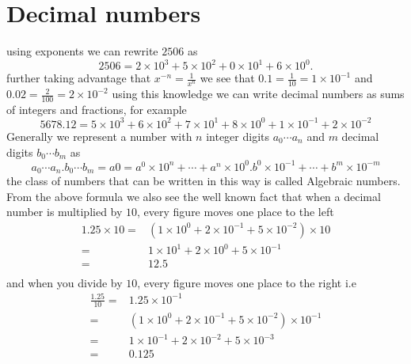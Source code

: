 \section{Decimal numbers}

using exponents we can rewrite $2506$ as
\[
2506 = 2 \times 10^3 + 5 \times 10^2 + 0 \times 10^1 + 6 \times 10^0.
\]
further taking advantage that $x^{-n} = \frac{1}{x^n}$ we see that $0.1 = \frac{1}{10} = 1 \times 10^{-1}$ and $0.02 = \frac{2}{100} = 2 \times 10^{-2}$ using this knowledge we can write decimal numbers as sums of integers and fractions, for example
\[
5678.12 = 5 \times 10^3 + 6 \times 10^2 + 7 \times 10^1 + 8 \times 10^0 + 1 \times
10^{-1} + 2 \times 10^{-2}
\]
Generally we represent a number with $n$ integer digits $a_0 \cdots a_n$ and $m$ decimal digits $b_0 \cdots b_m$ as
\[
a_0 \cdots a_n.b_0 \cdots b_m = a0 = a^0 \times 10^n + \cdots + a^n \times 10^0 . b^0 \times 10^{-1} + \cdots + b^m \times 10^{-m}
\]
the class of numbers that can be written in this way is called {Algebraic numbers}. From the above formula we also see the well known fact that when a decimal number is multiplied by $10$, every figure moves one place to the left
\begin{align*}
1.25 \times 10 =& (1 \times 10^0 + 2 \times 10^{-1} + 5 \times 10^{-2}) \times 10 \\
               =& 1 \times 10^1 + 2 \times 10^0 + 5 \times 10^{-1}                \\
               =& 12.5                                                            \\
\end{align*}
and when you divide by $10$, every figure moves one place to the right i.e
\begin{align*}
\frac{1.25}{10} =& 1.25 \times 10^{-1}                                                  \\
                =& (1 \times 10^0 + 2 \times 10^{-1} + 5 \times 10^{-2}) \times 10^{-1} \\
                =& 1 \times 10^{-1} + 2 \times 10^{-2} + 5 \times 10^{-3}               \\
                =& 0.125                                                                \\
\end{align*}

